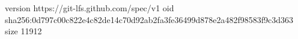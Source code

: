 version https://git-lfs.github.com/spec/v1
oid sha256:0d797c00c822e4c82de14c70d92ab2fa3fe36499d878e2a482f98583f9c3d363
size 11912
